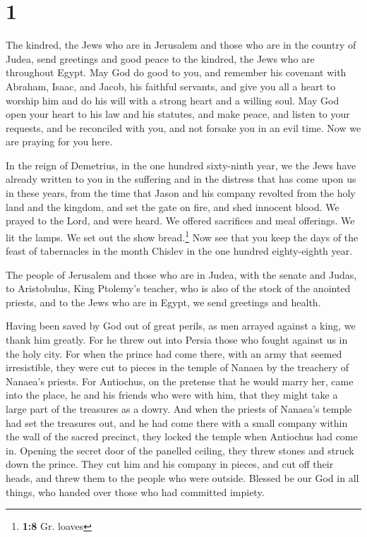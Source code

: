 \hypertarget{section}{%
\section{1}\label{section}}

 The kindred, the Jews who are in Jerusalem and those who
are in the country of Judea, send greetings and good peace to the
kindred, the Jews who are throughout Egypt.  May God do
good to you, and remember his covenant with Abraham, Isaac, and Jacob,
his faithful servants,  and give you all a heart to
worship him and do his will with a strong heart and a willing soul.
 May God open your heart to his law and his statutes, and
make peace,  and listen to your requests, and be
reconciled with you, and not forsake you in an evil time. 
Now we are praying for you here.

 In the reign of Demetrius, in the one hundred sixty-ninth
year, we the Jews have already written to you in the suffering and in
the distress that has come upon us in these years, from the time that
Jason and his company revolted from the holy land and the kingdom,
 and set the gate on fire, and shed innocent blood. We
prayed to the Lord, and were heard. We offered sacrifices and meal
offerings. We lit the lamps. We set out the show bread.\footnote{\textbf{1:8}
  Gr. loaves}  Now see that you keep the days of the feast
of tabernacles in the month Chislev in the one hundred eighty-eighth
year.

 The people of Jerusalem and those who are in Judea, with
the senate and Judas, to Aristobulus, King Ptolemy's teacher, who is
also of the stock of the anointed priests, and to the Jews who are in
Egypt, we send greetings and health.

 Having been saved by God out of great perils, as men
arrayed against a king, we thank him greatly.  For he
threw out into Persia those who fought against us in the holy city.
 For when the prince had come there, with an army that
seemed irresistible, they were cut to pieces in the temple of Nanaea by
the treachery of Nanaea's priests.  For Antiochus, on the
pretense that he would marry her, came into the place, he and his
friends who were with him, that they might take a large part of the
treasures as a dowry.  And when the priests of Nanaea's
temple had set the treasures out, and he had come there with a small
company within the wall of the sacred precinct, they locked the temple
when Antiochus had come in.  Opening the secret door of
the panelled ceiling, they threw stones and struck down the prince. They
cut him and his company in pieces, and cut off their heads, and threw
them to the people who were outside.  Blessed be our God
in all things, who handed over those who had committed impiety.

